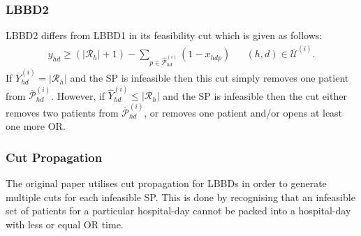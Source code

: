 \subsubsection{LBBD2}
LBBD2 differs from LBBD1 in its feasibility cut which is given as follows:
\begin{align*}
    y_{hd} \geq (|\mathcal{R}_h| + 1) - \sum\limits_{p \in \hat{\mathcal{P}}_{hd}^{(i)}}(1-x_{hdp}) && (h,d) \in \overline{\mathcal{U}}^{(i)}.
\end{align*}
If $\overline{Y}_{hd}^{(i)} = |\mathcal{R}_h|$ and the SP is infeasible then this cut simply removes one patient from $\overline{\mathcal{P}}_{hd}^{(i)}$. However, if $\hat{Y}_{hd}^{(i)} \le |\mathcal{R}_h|$ and the SP is infeasible then the cut either removes two patients from $\overline{\mathcal{P}}_{hd}^{(i)}$, or removes one patient and/or opens at least one more OR.
\subsubsection{Cut Propagation}
The original paper utilises cut propagation for LBBDs in order to generate multiple cuts for each infeasible SP. This is done by recognising that an infeasible set of patients for a particular hospital-day cannot be packed into a hospital-day with less or equal OR time.
